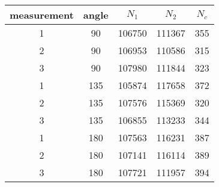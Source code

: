 \begin{tabular}{ccccc}
\toprule
measurement&angle&$N_1$&$N_2$&$N_c$\\
\midrule
1&90&106750&111367&355\\ 
2&90&106953&110586&315\\ 
3&90&107980&111844&323\\ 
1&135&105874&117658&372\\ 
2&135&107576&115369&320\\ 
3&135&106855&113233&344\\ 
1&180&107563&116231&387\\ 
2&180&107141&116114&389\\ 
3&180&107721&111957&394\\ 
\bottomrule
\end{tabular}
